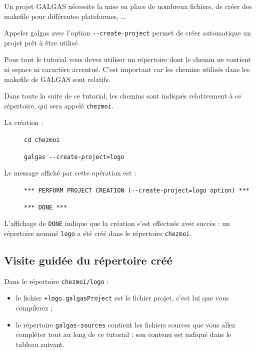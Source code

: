 Un projet GALGAS nécessite la mise en place de nombreux fichiers, de créer des makefile pour différentes plateformes, … 

Appeler galgas avec l'option \texttt{-{}-create-project} permet de créer automatique un projet prêt à être utilisé.

Pour tout le tutorial vous devez utiliser un répertoire dont le chemin ne contient ni espace ni caractère accentué. C'est important car les chemins utilisés dans les makefile de GALGAS sont relatifs.

Dans toute la suite de ce tutorial, les chemins sont indiqués relativement à ce répertoire, qui sera appelé \texttt{chezmoi}.

La création :
\begin{description}
  \item[ ] \texttt{cd chezmoi}
  \item[ ] \texttt{galgas -{}-create-project=logo}
\end{description}

Le message affiché par cette opération est :
\begin{description}
  \item[ ] \texttt{*** PERFORM PROJECT CREATION (-{}-create-project=logo option) ***}
  \item[ ] \texttt{*** DONE ***}
\end{description}

L’affichage de \texttt{DONE} indique que la création s’est effectuée avec succès : un répertoire nommé \texttt{logo} a été créé dans le répertoire \texttt{chezmoi}.

\subsection{Visite guidée du répertoire créé}

Dans le répertoire \texttt{chezmoi/logo} :
\begin{itemize}
  \item le fichier \texttt{+logo.galgasProject} est le fichier projet, c’est lui que vous compilerez ;
  \item le répertoire \texttt{galgas-sources} contient les fichiers sources que vous allez compléter tout au long de ce tutorial ; son contenu est indiqué dans le tableau suivant.
\end{itemize}


